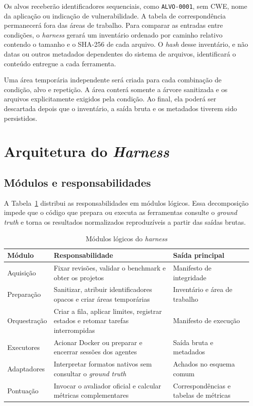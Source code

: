 Os alvos receberão identificadores sequenciais, como \texttt{ALVO-0001}, sem CWE, nome da aplicação ou indicação de vulnerabilidade. A tabela de correspondência permanecerá fora das áreas de trabalho. Para comparar as entradas entre condições, o \textit{harness} gerará um inventário ordenado por caminho relativo contendo o tamanho e o SHA-256 de cada arquivo. O \textit{hash} desse inventário, e não datas ou outros metadados dependentes do sistema de arquivos, identificará o conteúdo entregue a cada ferramenta.

Uma área temporária independente será criada para cada combinação de condição, alvo e repetição. A área conterá somente a árvore sanitizada e os arquivos explicitamente exigidos pela condição. Ao final, ela poderá ser descartada depois que o inventário, a saída bruta e os metadados tiverem sido persistidos.

\section{Arquitetura do \textit{Harness}}\label{sec:arquitetura-harness}

\subsection{Módulos e responsabilidades}\label{subsec:modulos-harness}

A Tabela~\ref{tab:modulos-harness} distribui as responsabilidades em módulos lógicos. Essa decomposição impede que o código que prepara ou executa as ferramentas consulte o \textit{ground truth} e torna os resultados normalizados reproduzíveis a partir das saídas brutas.

\begin{table}[htb]
\ABNTEXfontereduzida
\caption{\label{tab:modulos-harness}Módulos lógicos do \textit{harness}}
\centering
\begin{tabularx}{\textwidth}{|l|X|X|}
\hline
\textbf{Módulo} & \textbf{Responsabilidade} & \textbf{Saída principal} \\
\hline
Aquisição & Fixar revisões, validar o benchmark e obter os projetos & Manifesto de integridade \\
\hline
Preparação & Sanitizar, atribuir identificadores opacos e criar áreas temporárias & Inventário e área de trabalho \\
\hline
Orquestração & Criar a fila, aplicar limites, registrar estados e retomar tarefas interrompidas & Manifesto de execução \\
\hline
Executores & Acionar Docker ou preparar e encerrar sessões dos agentes & Saída bruta e metadados \\
\hline
Adaptadores & Interpretar formatos nativos sem consultar o \textit{ground truth} & Achados no esquema comum \\
\hline
Pontuação & Invocar o avaliador oficial e calcular métricas complementares & Correspondências e tabelas de métricas \\
\hline
\end{tabularx}
\end{table}

